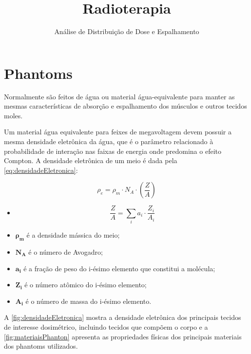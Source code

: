 \documentclass[11pt,a4paper]{article}
\title{\LobsterTwo\Huge{Radioterapia}}
\author{\LobsterTwo\LARGE{Análise de Distribuição de Dose e Espalhamento\nocite{*}}}
\date{\LobsterTwo{Dalila Mendonça}}
\newcounter{exemplo}
\begin{document}
	\maketitle

	\section{Phantoms}

	Normalmente são feitos de água ou material água-equivalente para manter as mesmas características de absorção e espalhamento dos músculos e outros tecidos moles.

	Um material água equivalente para feixes de megavoltagem devem possuir a mesma densidade eletrônica da água, que é o parâmetro relacionado à probabilidade de interação nas faixas de energia onde predomina o efeito Compton. A densidade eletrônica de um meio é dada pela \ref{eq:densidadeEletronica}:

		\begin{equation}
			\rho_e = \rho_m \cdot N_A \cdot \left(\frac{Z}{A}\right)
			\label{eq:densidadeEletronica}
		\end{equation}

		\begin{exemplo}[onde:]
			\begin{itemize}
				\item \begin{equation}
							\frac{Z}{A} = \sum_{i} a_i \cdot \frac{Z_i}{A_i}
					\end{equation}
		\item \textcolor{CarnationPink}{$\mathbf{\rho_m}$} é a densidade mássica do meio;
		\item \textcolor{CarnationPink}{$\mathbf{N_A}$} é o número de Avogadro;
		\item \textcolor{CarnationPink}{$\mathbf{a_i}$} é a fração de peso do i-ésimo elemento que constitui a molécula;
		\item \textcolor{CarnationPink}{$\mathbf{Z_i}$} é o número atômico do i-ésimo elemento;
		\item \textcolor{CarnationPink}{$\mathbf{A_i}$} é o número de massa do i-ésimo elemento.
			  \end{itemize}
		\end{exemplo}

	A \ref{fig:densidadeEletronica} mostra a densidade eletrônica dos principais tecidos de interesse dosimétrico, incluindo tecidos que compõem o corpo e a \ref{fig:materiaisPhanton} apresenta as propriedades físicas dos principais materiais dos phantoms utilizados.
\end{document}
